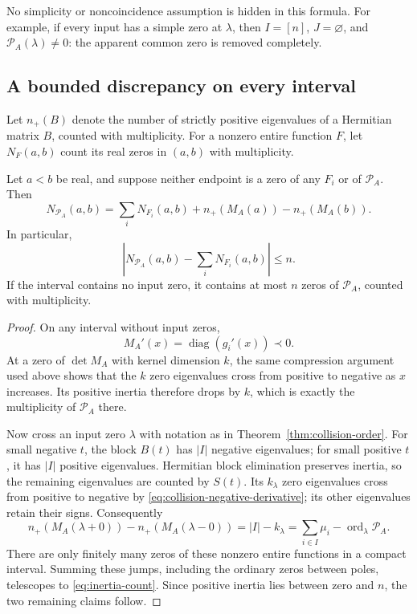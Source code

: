 No simplicity or noncoincidence assumption is hidden in this formula.
For example, if every input has a simple zero at $\lambda$, then
$I=[n]$, $J=\varnothing$, and $\mathcal P_A(\lambda)\neq0$:
the apparent common zero is removed completely.

\subsection{A bounded discrepancy on every interval}

Let $n_+(B)$ denote the number of strictly positive eigenvalues of a
Hermitian matrix $B$, counted with multiplicity.  For a nonzero entire
function $F$, let $N_F(a,b)$ count its real zeros in $(a,b)$ with
multiplicity.

\begin{theorem}\label{thm:entire-count}
Let $a<b$ be real, and suppose neither endpoint is a zero of any $F_i$
or of $\mathcal P_A$.  Then
\begin{equation}\label{eq:inertia-count}
 \boxed{\quad
 N_{\mathcal P_A}(a,b)
  =\sum_iN_{F_i}(a,b)
     +n_+(M_A(a))-n_+(M_A(b)).
 \quad}
\end{equation}
In particular,
\begin{equation}\label{eq:count-discrepancy}
 \left|N_{\mathcal P_A}(a,b)-\sum_iN_{F_i}(a,b)\right|\leq n.
\end{equation}
If the interval contains no input zero, it contains at most $n$ zeros
of $\mathcal P_A$, counted with multiplicity.
\end{theorem}
\begin{proof}
On any interval without input zeros,
\[
 M_A'(x)=\operatorname{diag}(g_i'(x))\prec0.
\]
At a zero of $\det M_A$ with kernel dimension $k$, the same compression
argument used above shows that the $k$ zero eigenvalues cross from
positive to negative as $x$ increases.  Its positive inertia therefore
drops by $k$, which is exactly the multiplicity of $\mathcal P_A$ there.

Now cross an input zero $\lambda$ with notation as in
Theorem~\ref{thm:collision-order}.  For small negative $t$, the block
$B(t)$ has $|I|$ negative eigenvalues; for small positive $t$, it has
$|I|$ positive eigenvalues.  Hermitian block elimination preserves
inertia, so the remaining eigenvalues are counted by $S(t)$.
Its $k_\lambda$ zero eigenvalues cross from positive to negative by
\eqref{eq:collision-negative-derivative}; its other eigenvalues retain
their signs.  Consequently
\[
 n_+(M_A(\lambda+0))-n_+(M_A(\lambda-0))
       =|I|-k_\lambda
       =\sum_{i\in I}\mu_i
          -\operatorname{ord}_{\lambda}\mathcal P_A.
\]
There are only finitely many zeros of these nonzero entire functions
in a compact interval.  Summing these jumps, including the ordinary
zeros between poles, telescopes to \eqref{eq:inertia-count}.
Since positive inertia lies between zero and $n$, the two remaining
claims follow.
\end{proof}

